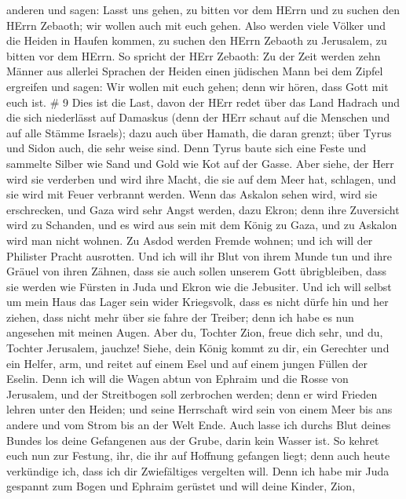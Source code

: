 anderen und sagen: Lasst uns gehen, zu bitten vor dem HErrn und zu
suchen den HErrn Zebaoth; wir wollen auch mit euch gehen. 
Also werden viele Völker und die Heiden in Haufen kommen, zu suchen den
HErrn Zebaoth zu Jerusalem, zu bitten vor dem HErrn.  So
spricht der HErr Zebaoth: Zu der Zeit werden zehn Männer aus allerlei
Sprachen der Heiden einen jüdischen Mann bei dem Zipfel ergreifen und
sagen: Wir wollen mit euch gehen; denn wir hören, dass Gott mit euch
ist. \# 9  Dies ist die Last, davon der HErr redet über das
Land Hadrach und die sich niederlässt auf Damaskus (denn der HErr schaut
auf die Menschen und auf alle Stämme Israels);  dazu auch
über Hamath, die daran grenzt; über Tyrus und Sidon auch, die sehr weise
sind.  Denn Tyrus baute sich eine Feste und sammelte Silber
wie Sand und Gold wie Kot auf der Gasse.  Aber siehe, der
Herr wird sie verderben und wird ihre Macht, die sie auf dem Meer hat,
schlagen, und sie wird mit Feuer verbrannt werden.  Wenn das
Askalon sehen wird, wird sie erschrecken, und Gaza wird sehr Angst
werden, dazu Ekron; denn ihre Zuversicht wird zu Schanden, und es wird
aus sein mit dem König zu Gaza, und zu Askalon wird man nicht wohnen.
 Zu Asdod werden Fremde wohnen; und ich will der Philister
Pracht ausrotten.  Und ich will ihr Blut von ihrem Munde tun
und ihre Gräuel von ihren Zähnen, dass sie auch sollen unserem Gott
übrigbleiben, dass sie werden wie Fürsten in Juda und Ekron wie die
Jebusiter.  Und ich will selbst um mein Haus das Lager sein
wider Kriegsvolk, dass es nicht dürfe hin und her ziehen, dass nicht
mehr über sie fahre der Treiber; denn ich habe es nun angesehen mit
meinen Augen.  Aber du, Tochter Zion, freue dich sehr, und
du, Tochter Jerusalem, jauchze! Siehe, dein König kommt zu dir, ein
Gerechter und ein Helfer, arm, und reitet auf einem Esel und auf einem
jungen Füllen der Eselin.  Denn ich will die Wagen abtun
von Ephraim und die Rosse von Jerusalem, und der Streitbogen soll
zerbrochen werden; denn er wird Frieden lehren unter den Heiden; und
seine Herrschaft wird sein von einem Meer bis ans andere und vom Strom
bis an der Welt Ende.  Auch lasse ich durchs Blut deines
Bundes los deine Gefangenen aus der Grube, darin kein Wasser ist.
 So kehret euch nun zur Festung, ihr, die ihr auf Hoffnung
gefangen liegt; denn auch heute verkündige ich, dass ich dir
Zwiefältiges vergelten will.  Denn ich habe mir Juda
gespannt zum Bogen und Ephraim gerüstet und will deine Kinder, Zion,
